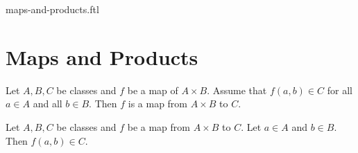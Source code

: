 \documentclass{naproche-library}
\begin{document}
\begin{smodule}{maps-and-products.ftl}

  \section*{Maps and Products}

  \begin{proposition}[forthel,id=FOUNDATIONS_06_2754759509409792]
    Let $A, B, C$ be classes and $f$ be a map of $A \times B$.
    Assume that $f(a,b) \in C$ for all $a \in A$ and all $b \in B$.
    Then $f$ is a map from $A \times B$ to $C$.
  \end{proposition}

  \begin{proposition}[forthel,id=FOUNDATIONS_06_2304295212941312]
    Let $A, B, C$ be classes and $f$ be a map from $A \times B$ to $C$.
    Let $a \in A$ and $b \in B$.
    Then $f(a,b) \in C$.
  \end{proposition}
\end{smodule}
\end{document}
